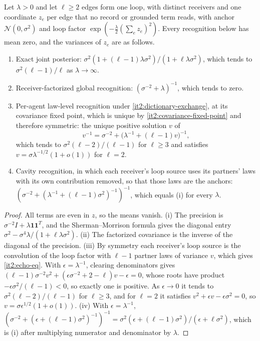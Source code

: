 Let $\lambda>0$ and let $\ell\geq2$ edges form one loop, with distinct receivers and one coordinate $z_e$ per edge that no record or grounded term reads, with anchor $\mathcal N(0,\sigma^2)$ and loop factor $\exp(-\frac\lambda2(\sum_ez_e)^2)$. Every recognition below has mean zero, and the variances of $z_e$ are as follows.
\begin{enumerate}
\item[(i)] Exact joint posterior: $\sigma^2(1+(\ell-1)\lambda\sigma^2)/(1+\ell\lambda\sigma^2)$, which tends to $\sigma^2(\ell-1)/\ell$ as $\lambda\to\infty$.
\item[(ii)] Receiver-factorized global recognition: $(\sigma^{-2}+\lambda)^{-1}$, which tends to zero.
\item[(iii)] Per-agent law-level recognition under \cref{it2:dictionary-exchange}, at its covariance fixed point, which is unique by \cref{it2:covariance-fixed-point} and therefore symmetric: the unique positive solution $v$ of
\begin{equation}
v^{-1}=\sigma^{-2}+\bigl(\lambda^{-1}+(\ell-1)v\bigr)^{-1},
\label{it2:echo-eq}
\end{equation}
which tends to $\sigma^2(\ell-2)/(\ell-1)$ for $\ell\geq3$ and satisfies $v=\sigma\lambda^{-1/2}(1+o(1))$ for $\ell=2$.
\item[(iv)] Cavity recognition, in which each receiver's loop source uses its partners' laws with its own contribution removed, so that those laws are the anchors: $(\sigma^{-2}+(\lambda^{-1}+(\ell-1)\sigma^2)^{-1})^{-1}$, which equals (i) for every $\lambda$.
\end{enumerate}
\begin{proof}
All terms are even in $z$, so the means vanish. (i) The precision is $\sigma^{-2}I+\lambda\mathbf 1\mathbf 1^T$, and the Sherman--Morrison formula gives the diagonal entry $\sigma^2-\sigma^4\lambda/(1+\ell\lambda\sigma^2)$. (ii) The factorized covariance is the inverse of the diagonal of the precision. (iii) By symmetry each receiver's loop source is the convolution of the loop factor with $\ell-1$ partner laws of variance $v$, which gives \cref{it2:echo-eq}. With $\epsilon=\lambda^{-1}$, clearing denominators gives $(\ell-1)\sigma^{-2}v^2+(\epsilon\sigma^{-2}+2-\ell)v-\epsilon=0$, whose roots have product $-\epsilon\sigma^2/(\ell-1)<0$, so exactly one is positive. As $\epsilon\to0$ it tends to $\sigma^2(\ell-2)/(\ell-1)$ for $\ell\geq3$, and for $\ell=2$ it satisfies $v^2+\epsilon v-\epsilon\sigma^2=0$, so $v=\sigma\epsilon^{1/2}(1+o(1))$. (iv) With $\epsilon=\lambda^{-1}$, $(\sigma^{-2}+(\epsilon+(\ell-1)\sigma^2)^{-1})^{-1}=\sigma^2(\epsilon+(\ell-1)\sigma^2)/(\epsilon+\ell\sigma^2)$, which is (i) after multiplying numerator and denominator by $\lambda$.
\end{proof}

